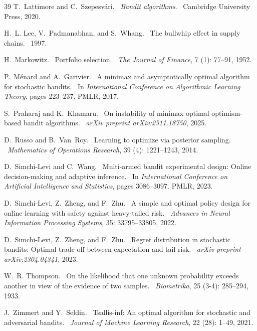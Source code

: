 \documentclass[nonblindrev]{informs3_noinforms}
\def\newblock{\ }%
\begin{document}
\begin{thebibliography}{39}
T.~Lattimore and C.~Szepesv{\'a}ri.
\newblock \emph{Bandit algorithms}.
\newblock Cambridge University Press, 2020.

H.~L. Lee, V.~Padmanabhan, and S.~Whang.
\newblock The bullwhip effect in supply chains.
\newblock 1997.

H.~Markowitz.
\newblock Portfolio selection.
\newblock \emph{The Journal of Finance}, 7 (1): 77--91, 1952.

P.~M{\'e}nard and A.~Garivier.
\newblock A minimax and asymptotically optimal algorithm for stochastic bandits.
\newblock In \emph{International Conference on Algorithmic Learning Theory}, pages 223--237. PMLR, 2017.

S.~Praharaj and K.~Khamaru.
\newblock On instability of minimax optimal optimism-based bandit algorithms.
\newblock \emph{arXiv preprint arXiv:2511.18750}, 2025.

D.~Russo and B.~Van~Roy.
\newblock Learning to optimize via posterior sampling.
\newblock \emph{Mathematics of Operations Research}, 39 (4): 1221--1243, 2014.

D.~Simchi-Levi and C.~Wang.
\newblock Multi-armed bandit experimental design: Online decision-making and adaptive inference.
\newblock In \emph{International Conference on Artificial Intelligence and Statistics}, pages 3086--3097. PMLR, 2023.

D.~Simchi-Levi, Z.~Zheng, and F.~Zhu.
\newblock A simple and optimal policy design for online learning with safety against heavy-tailed risk.
\newblock \emph{Advances in Neural Information Processing Systems}, 35: 33795--33805, 2022.

D.~Simchi-Levi, Z.~Zheng, and F.~Zhu.
\newblock Regret distribution in stochastic bandits: Optimal trade-off between expectation and tail risk.
\newblock \emph{arXiv preprint arXiv:2304.04341}, 2023.

W.~R. Thompson.
\newblock On the likelihood that one unknown probability exceeds another in view of the evidence of two samples.
\newblock \emph{Biometrika}, 25 (3-4): 285--294, 1933.

J.~Zimmert and Y.~Seldin.
\newblock Tsallis-inf: An optimal algorithm for stochastic and adversarial bandits.
\newblock \emph{Journal of Machine Learning Research}, 22 (28): 1--49, 2021.

\end{thebibliography}

\end{document}
